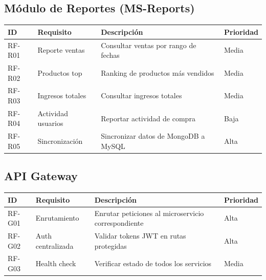 \documentclass[12pt,a4paper]{article}
\begin{document}
\subsection{M\'odulo de Reportes (MS-Reports)}
\begin{longtable}{llp{7cm}l}
\toprule
\textbf{ID} & \textbf{Requisito} & \textbf{Descripci\'on} & \textbf{Prioridad} \\
\midrule
\endhead
RF-R01 & Reporte ventas & Consultar ventas por rango de fechas & Media \\
RF-R02 & Productos top & Ranking de productos m\'as vendidos & Media \\
RF-R03 & Ingresos totales & Consultar ingresos totales & Media \\
RF-R04 & Actividad usuarios & Reportar actividad de compra & Baja \\
RF-R05 & Sincronizaci\'on & Sincronizar datos de MongoDB a MySQL & Alta \\
\bottomrule
\end{longtable}

\subsection{API Gateway}
\begin{longtable}{llp{7cm}l}
\toprule
\textbf{ID} & \textbf{Requisito} & \textbf{Descripci\'on} & \textbf{Prioridad} \\
\midrule
\endhead
RF-G01 & Enrutamiento & Enrutar peticiones al microservicio correspondiente & Alta \\
RF-G02 & Auth centralizada & Validar tokens JWT en rutas protegidas & Alta \\
RF-G03 & Health check & Verificar estado de todos los servicios & Media \\
\bottomrule
\end{longtable}
\end{document}

